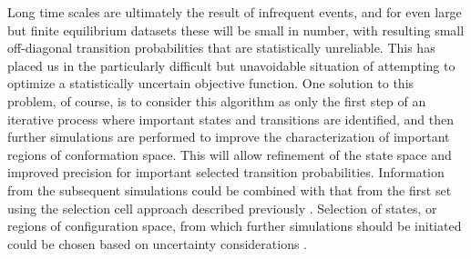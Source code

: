 Long time scales are ultimately the result of infrequent events, and for even large but finite equilibrium datasets these will be small in number, with resulting small off-diagonal transition probabilities that are statistically unreliable.  
This has placed us in the particularly difficult but unavoidable situation of attempting to optimize a statistically uncertain objective function.
One solution to this problem, of course, is to consider this algorithm as only the first step of an iterative process where important states and transitions are identified, and then further simulations are performed to improve the characterization
of important regions of conformation space.  This will allow refinement of the state space
and improved precision for important selected transition probabilities.  Information
from the subsequent simulations could be combined with that from the first set using the 
selection cell approach described previously \cite{swope:2004a}.  
Selection of states, or regions of configuration space, from which further simulations should be initiated could be chosen based on uncertainty considerations \cite{singhal:2005a}.






